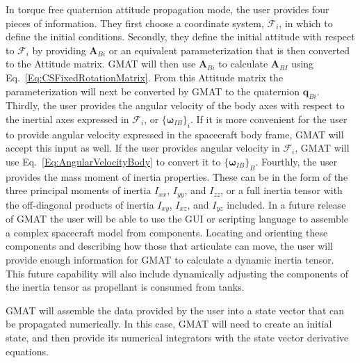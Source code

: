 In torque free quaternion attitude propagation mode, the user provides four
pieces of information.  They first choose a coordinate system, $\mathcal{F}_i$,
in which to define the initial conditions.  Secondly, they define the initial
attitude with respect to $\mathcal{F}_i$ by providing $\mathbf{A}_{Bi}$ or an
equivalent parameterization that is then converted to the Attitude matrix.  GMAT
will then use $\mathbf{A}_{Bi}$ to calculate $\mathbf{A}_{BI}$ using
Eq.~\ref{Eq:CSFixedRotationMatrix}.  From this Attitude matrix the
parameterization will next be converted by GMAT to the quaternion
$\boldsymbol q_{Bi}$.  Thirdly, the user provides the angular velocity of the body
axes with respect to the inertial axes expressed in $\mathcal{F}_i$, or
$\{ \boldsymbol\omega_{IB}\}_i$.  If it is more convenient for the user to
provide angular velocity expressed in the spacecraft body frame, GMAT will accept
this input as well.  If the user provides angular velocity in $\mathcal{F}_i$,
GMAT will use Eq.~\ref{Eq:AngularVelocityBody} to convert it to
$\{\boldsymbol\omega_{IB}\}_B$.  Fourthly, the user provides the mass moment of
inertia properties.  These can be in the form of the three principal moments of
inertia $I_{xx}$, $I_{yy}$, and $I_{zz}$, or a full inertia tensor with the
off-diagonal products of inertia $I_{xy}$, $I_{xz}$, and $I_{yz}$ included.  In
a future release of GMAT the user will be able to use the GUI or scripting
language to assemble a complex spacecraft model from components.  Locating and
orienting these components and describing how those that articulate can move,
the user will provide enough information for GMAT to calculate a dynamic inertia
tensor.  This future capability will also include dynamically adjusting the
components of the inertia tensor as propellant is consumed from tanks.

\newpage
GMAT will assemble the data provided by the user into a state vector that can be
propagated numerically.  In this case, GMAT will need to create an initial state,
and then provide its numerical integrators with the state vector derivative
equations.

